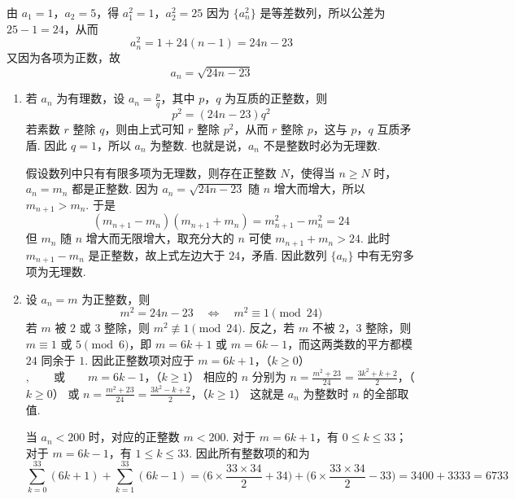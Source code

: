 \begin{solution}
由 \(a_{1}=1\)，\(a_{2}=5\)，得
\(a_{1}^{2}=1\)，\(a_{2}^{2}=25\)
因为 \(\{a_{n}^{2}\}\) 是等差数列，所以公差为 \(25-1=24\)，从而
\[
a_{n}^{2}=1+24(n-1)=24n-23
\]
又因为各项为正数，故
\[
a_{n}=\sqrt{24n-23}
\]

\begin{enumerate}
\item 若 \(a_{n}\) 为有理数，设 \(a_{n}=\frac{p}{q}\)，其中 \(p\)，\(q\) 为互质的正整数，则
\[
p^{2}=(24n-23)q^{2}
\]
若素数 \(r\) 整除 \(q\)，则由上式可知 \(r\) 整除 \(p^{2}\)，从而 \(r\) 整除 \(p\)，这与 \(p\)，\(q\) 互质矛盾. 因此 \(q=1\)，所以 \(a_{n}\) 为整数. 也就是说，\(a_{n}\) 不是整数时必为无理数.

假设数列中只有有限多项为无理数，则存在正整数 \(N\)，使得当 \(n\geqslant N\) 时，\(a_{n}=m_{n}\) 都是正整数. 因为 \(a_{n}=\sqrt{24n-23}\) 随 \(n\) 增大而增大，所以 \(m_{n+1}>m_{n}\). 于是
\[
(m_{n+1}-m_{n})(m_{n+1}+m_{n})=m_{n+1}^{2}-m_{n}^{2}=24
\]
但 \(m_{n}\) 随 \(n\) 增大而无限增大，取充分大的 \(n\) 可使 \(m_{n+1}+m_{n}>24\). 此时 \(m_{n+1}-m_{n}\) 是正整数，故上式左边大于 \(24\)，矛盾. 因此数列 \(\{a_{n}\}\) 中有无穷多项为无理数.

\item 设 \(a_{n}=m\) 为正整数，则
\[
m^{2}=24n-23
\quad\Longleftrightarrow\quad
m^{2}\equiv1\pmod{24}
\]
若 \(m\) 被 \(2\) 或 \(3\) 整除，则 \(m^{2}\not\equiv1\pmod{24}\). 反之，若 \(m\) 不被 \(2\)，\(3\) 整除，则 \(m\equiv1\) 或 \(5\pmod{6}\)，即 \(m=6k+1\) 或 \(m=6k-1\)，而这两类数的平方都模 \(24\) 同余于 \(1\). 因此正整数项对应于
\(m=6k+1\)，（\(k\geqslant0\)）\(,\qquad\text{或}\qquad m=6k-1\)，（\(k\geqslant1\)）
相应的 \(n\) 分别为
\(n=\frac{m^{2}+23}{24}=\frac{3k^{2}+k+2}{2}\)，（\(k\geqslant0\)）
或
\(n=\frac{m^{2}+23}{24}=\frac{3k^{2}-k+2}{2}\)，（\(k\geqslant1\)）
这就是 \(a_{n}\) 为整数时 \(n\) 的全部取值.

当 \(a_{n}<200\) 时，对应的正整数 \(m<200\). 对于 \(m=6k+1\)，有 \(0\leqslant k\leqslant33\)；对于 \(m=6k-1\)，有 \(1\leqslant k\leqslant33\). 因此所有整数项的和为
\[
\sum_{k=0}^{33}(6k+1)+\sum_{k=1}^{33}(6k-1)
=\bigl(6\times\frac{33\times34}{2}+34\bigr)+\bigl(6\times\frac{33\times34}{2}-33\bigr)
=3400+3333=6733
\]
\end{enumerate}
\end{solution}
